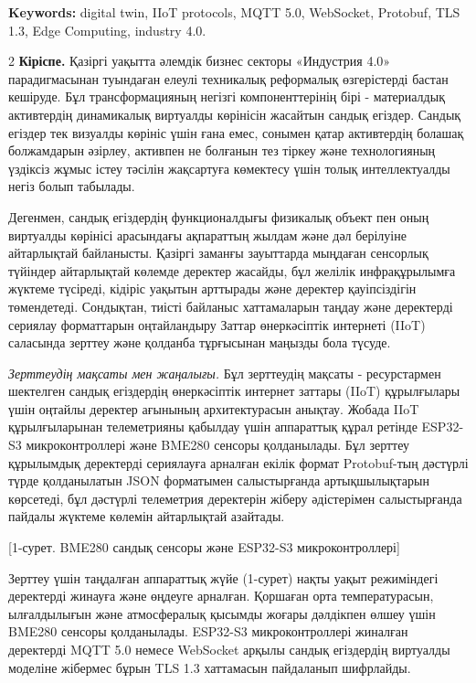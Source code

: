 {\bfseries Keywords:} digital twin, IIoT protocols, MQTT 5.0, WebSocket,
Protobuf, TLS 1.3, Edge Computing, industry 4.0.

\begin{multicols}{2}
{\bfseries Кіріспе.} Қазіргі уақытта әлемдік бизнес секторы «Индустрия 4.0»
парадигмасынан туындаған елеулі техникалық реформалық өзгерістерді
бастан кешіруде. Бұл трансформацияның негізгі компоненттерінің бірі -
материалдық активтердің динамикалық виртуалды көрінісін жасайтын сандық
егіздер. Сандық егіздер тек визуалды көрініс үшін ғана емес, сонымен
қатар активтердің болашақ болжамдарын әзірлеу, активпен не болғанын тез
тіркеу және технологияның үздіксіз жұмыс істеу тәсілін жақсартуға
көмектесу үшін толық интеллектуалды негіз болып табылады.

Дегенмен, сандық егіздердің функционалдығы физикалық объект пен оның
виртуалды көрінісі арасындағы ақпараттың жылдам және дәл берілуіне
айтарлықтай байланысты. Қазіргі заманғы зауыттарда мыңдаған сенсорлық
түйіндер айтарлықтай көлемде деректер жасайды, бұл желілік
инфрақұрылымға жүктеме түсіреді, кідіріс уақытын арттырады және деректер
қауіпсіздігін төмендетеді. Сондықтан, тиісті байланыс хаттамаларын
таңдау және деректерді сериялау форматтарын оңтайландыру Заттар
өнеркәсіптік интернеті (IIoT) саласында зерттеу және қолданба тұрғысынан
маңызды бола түсуде.

\emph{Зерттеудің мақсаты мен жаңалығы.} Бұл зерттеудің мақсаты -
ресурстармен шектелген сандық егіздердің өнеркәсіптік интернет заттары
(IIoT) құрылғылары үшін оңтайлы деректер ағынының архитектурасын
анықтау. Жобада IIoT құрылғыларынан телеметрияны қабылдау үшін
аппараттық құрал ретінде ESP32-S3 микроконтроллері және BME280 сенсоры
қолданылады. Бұл зерттеу құрылымдық деректерді сериялауға арналған
екілік формат Protobuf-тың дәстүрлі түрде қолданылатын JSON форматымен
салыстырғанда артықшылықтарын көрсетеді, бұл дәстүрлі телеметрия
деректерін жіберу әдістерімен салыстырғанда пайдалы жүктеме көлемін
айтарлықтай азайтады.

[1-сурет. BME280 сандық сенсоры және ESP32-S3 микроконтроллері]

Зерттеу үшін таңдалған аппараттық жүйе (1-сурет) нақты уақыт режиміндегі
деректерді жинауға және өңдеуге арналған. Қоршаған орта температурасын,
ылғалдылығын және атмосфералық қысымды жоғары дәлдікпен өлшеу үшін
BME280 сенсоры қолданылады. ESP32-S3 микроконтроллері жиналған
деректерді MQTT 5.0 немесе WebSocket арқылы сандық егіздердің виртуалды
моделіне жібермес бұрын TLS 1.3 хаттамасын пайдаланып шифрлайды.


\end{multicols}
